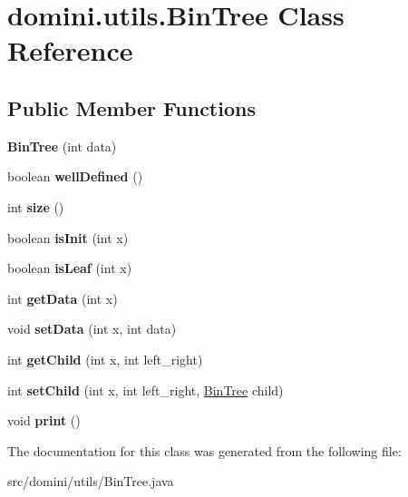 \hypertarget{classdomini_1_1utils_1_1BinTree}{}\section{domini.\+utils.\+Bin\+Tree Class Reference}
\label{classdomini_1_1utils_1_1BinTree}
\subsection*{Public Member Functions}
\begin{DoxyCompactItemize}
\item 
\mbox{\label{classdomini_1_1utils_1_1BinTree_a83904c6ebf931ba29a134be5f29a66c7}} 
{\bfseries Bin\+Tree} (int data)
\item 
\mbox{\label{classdomini_1_1utils_1_1BinTree_a742c520d5bff9a17a4cd56d833aa62c0}} 
boolean {\bfseries well\+Defined} ()
\item 
\mbox{\label{classdomini_1_1utils_1_1BinTree_a08e528b0f5bbebe0a5382be7f8e73a55}} 
int {\bfseries size} ()
\item 
\mbox{\label{classdomini_1_1utils_1_1BinTree_a6be9277eaecc3750a8aedfa045f8142b}} 
boolean {\bfseries is\+Init} (int x)
\item 
\mbox{\label{classdomini_1_1utils_1_1BinTree_a52ea101b3e66d5389a2350e6c777c517}} 
boolean {\bfseries is\+Leaf} (int x)
\item 
\mbox{\label{classdomini_1_1utils_1_1BinTree_a256937f5412ac463258c67b8190708ba}} 
int {\bfseries get\+Data} (int x)
\item 
\mbox{\label{classdomini_1_1utils_1_1BinTree_a35dbfcf3a00a10d46240ce6295d4454c}} 
void {\bfseries set\+Data} (int x, int data)
\item 
\mbox{\label{classdomini_1_1utils_1_1BinTree_ab44a6f728b74f5b3f0bd583d858de57e}} 
int {\bfseries get\+Child} (int x, int left\+\_\+right)
\item 
\mbox{\label{classdomini_1_1utils_1_1BinTree_a8efc5cd06c9e5bad98ab7da0bc72c1cf}} 
int {\bfseries set\+Child} (int x, int left\+\_\+right, \hyperlink{classdomini_1_1utils_1_1BinTree}{Bin\+Tree} child)
\item 
\mbox{\label{classdomini_1_1utils_1_1BinTree_ad8f921ac94ebe2a1007ed41b935099b1}} 
void {\bfseries print} ()
\end{DoxyCompactItemize}


The documentation for this class was generated from the following file\+:\begin{DoxyCompactItemize}
\item 
src/domini/utils/Bin\+Tree.\+java\end{DoxyCompactItemize}
